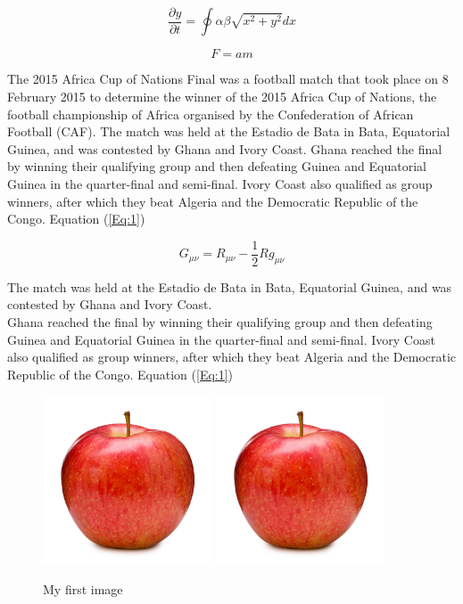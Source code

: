 \documentclass[11pt,a4]{article}
\begin{document}
\begin{equation}
\frac{\partial y}{\partial t}=\oint\alpha\beta\sqrt{x^2+y^2} dx
\label{My_eq}
\end{equation}

\begin{equation}
F=am
\label{Eq:1}
\end{equation}


The 2015 Africa Cup of Nations Final was a football match that took place on 8 February 2015 to determine the winner of the 2015 Africa Cup of Nations, the football championship of Africa organised by the Confederation of African Football (CAF). The match was held at the Estadio de Bata in Bata, Equatorial Guinea, and was contested by Ghana and Ivory Coast. Ghana reached the final by winning their qualifying group and then defeating Guinea and Equatorial Guinea in the quarter-final and semi-final. Ivory Coast also qualified as group winners, after which they beat Algeria and the Democratic Republic of the Congo. Equation (\ref{Eq:1})

\begin{equation}
G_{\mu \nu }=R_{\mu \nu }-{\frac {1}{2}}Rg_{\mu \nu }
\end{equation}

The match was held at the Estadio de Bata in Bata, Equatorial Guinea, and was contested by Ghana and Ivory Coast.\\

Ghana reached the final by winning their qualifying group and then defeating Guinea and Equatorial Guinea in the quarter-final and semi-final. Ivory Coast also qualified as group winners, after which they beat Algeria and the Democratic Republic of the Congo. Equation (\ref{Eq:1})

\begin{figure}[h]
	\centering
	\includegraphics[width=5cm]{images/fig1}
	\includegraphics[width=5cm]{images/fig1}
	\caption{My first image}
	\label{fig:1}
\end{figure}
\end{document}
